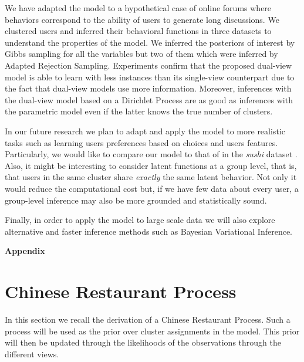 \documentclass[smallextended]{svjour3}          %
\begin{document}
We have adapted the model to a hypothetical case of online forums where behaviors correspond to the ability of users to generate long discussions. We clustered users and inferred their behavioral functions in three datasets to understand the properties of the model. We inferred the posteriors of interest by Gibbs sampling for all the variables but two of them which were inferred by Adapted Rejection Sampling. Experiments confirm that the proposed dual-view model is able to learn with less instances than its single-view counterpart due to the fact that dual-view models use more information. Moreover, inferences with the dual-view model based on a Dirichlet Process are as good as inferences with the parametric model even if the latter knows the true number of clusters.

In our future research we plan to adapt and apply the model to more realistic tasks such as learning users preferences based on choices and users features. Particularly, we would like to compare our model to that of \cite{Abbasnejad2013a} in the \textit{sushi} dataset \citep{Kamishima2009}. Also, it
might be interesting to consider latent functions at a group level, that is, that users in the same cluster share \textit{exactly} the same latent behavior. Not only it would reduce the computational cost but, if we have few data about every user, a group-level inference may also be more grounded and statistically sound.

Finally, in order to apply the model to large scale data we will also explore alternative and faster inference methods such as Bayesian Variational Inference.

\newpage
\appendix
\noindent \textbf{\Large Appendix}
\vspace{-0.1cm}
\section{Chinese Restaurant Process}
In this section we recall the derivation of a Chinese Restaurant Process. Such a process will be used as the prior over cluster assignments in the model. This prior will then be updated through the likelihoods of the observations through the different views. 
\end{document}
